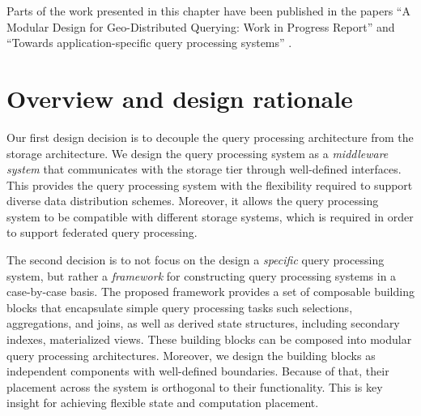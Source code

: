 
Parts of the work presented in this chapter have been published in the papers ``A Modular Design for Geo-Distributed Querying: Work in Progress Report'' \cite{10.1145/3194261.3194265}
and ``Towards application-specific query processing systems'' \cite{app:rep:sh222}.

\section{Overview and design rationale}
\label{sec:design_rationale}
Our first design decision is to decouple the query processing architecture from the storage architecture.
We design the query processing system as a \textit{middleware system} that communicates with the storage tier through
well-defined interfaces.
This provides the query processing system with the flexibility required to support diverse data distribution schemes.
Moreover, it allows the query processing system to be compatible with different storage systems,
which is required in order to support federated query processing.

\medskip
\noindent
The second decision is to not focus on the design a \textit{specific} query processing system,
but rather a \textit{framework} for constructing query processing systems in a case-by-case basis.
The proposed framework provides a set of composable building blocks that encapsulate simple query processing tasks
such selections, aggregations, and joins, as well as derived state structures, including secondary indexes, materialized views.
These building blocks can be composed into modular query processing architectures.
Moreover, we design the building blocks as independent components with well-defined boundaries.
Because of that, their placement across the system is orthogonal to their functionality.
This is key insight for achieving flexible state and computation placement.



